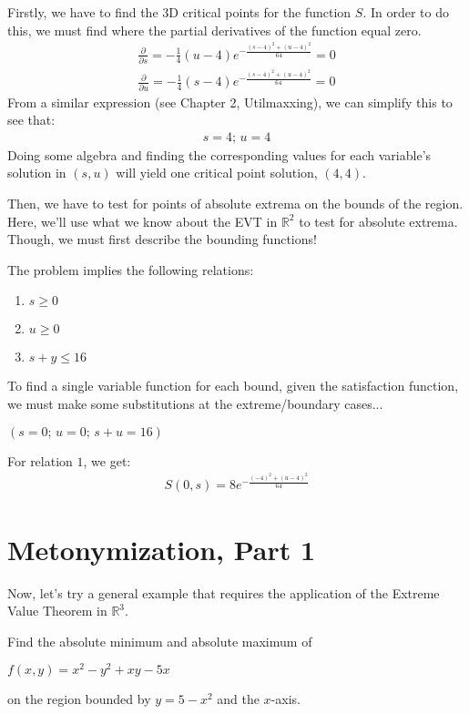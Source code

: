 Firstly, we have to find the $3$D critical points for the function $S$.
In order to do this, we must find where the partial derivatives of the function equal zero.
\begin{align*}
	\frac{\partial}{\partial s} = -\frac{1}{4}(u-4)e^{-\frac{(s-4)^2+(u-4)^2}{64}}=0\\
	\frac{\partial}{\partial u} = -\frac{1}{4}(s-4)e^{-\frac{(s-4)^2+(u-4)^2}{64}}=0
\end{align*}
From a similar expression (see Chapter 2, Utilmaxxing), we can simplify this to see that:
\begin{align*}
	s = 4\text{; }u = 4
\end{align*}
Doing some algebra and finding the corresponding values for each variable's solution in $(s, u)$ will yield one critical point solution, $(4, 4)$.

Then, we have to test for points of absolute extrema on the bounds of the region.
Here, we'll use what we know about the EVT in $\mathbb{R}^2$ to test for absolute extrema.
Though, we must first describe the bounding functions!

The problem implies the following relations:
\begin{enumerate}
	\item $s\geq 0$
	\item $u\geq 0$
	\item $s+y\leq 16$
\end{enumerate}

To find a single variable function for each bound, given the satisfaction function, we must make some substitutions at the extreme/boundary cases...
\begin{center}
	$(s=0\text{; }u=0\text{; }s+u=16)$
\end{center}

For relation $1$, we get:
\begin{align*}
	S(0, s) = 8e^{-\frac{(-4)^2+(u-4)^2}{64}}
\end{align*}
\setcounter{chapter}{4}
\chapter{Metonymization, Part 1}
Now, let's try a general example that requires the application of the Extreme Value Theorem in $\mathbb{R}^3$.
\begin{eg}
	Find the absolute minimum and absolute maximum of
	\begin{center}
		$f(x, y) = x^2 - y^2 + xy - 5x$
	\end{center}
	on the region bounded by $y = 5 - x^2$ and the $x$-axis.
\end{eg}
